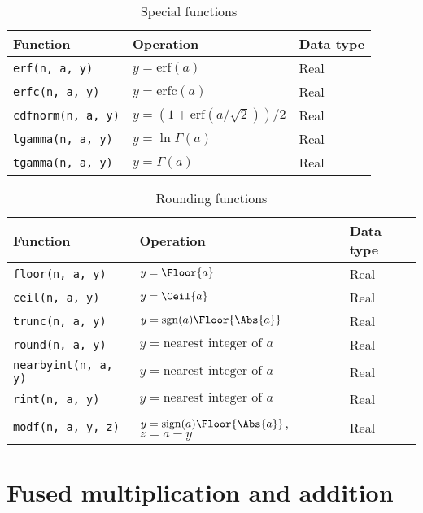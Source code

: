 \begin{table}
  \begin{tabularx}{\textwidth}{LLL}
    \toprule
    Function & Operation & Data type \\
    \midrule
    \texttt{erf(n, a, y)}     & $y = \mathrm{erf}(a)$  & Real \\
    \texttt{erfc(n, a, y)}    & $y = \mathrm{erfc}(a)$ & Real \\
    \texttt{cdfnorm(n, a, y)} & $y = (1 + \mathrm{erf}(a / \sqrt{2})) / 2$
    & Real \\
    \texttt{lgamma(n, a, y)}  & $y = \ln\Gamma(a)$     & Real \\
    \texttt{tgamma(n, a, y)}  & $y = \Gamma(a)$        & Real \\
    \bottomrule
  \end{tabularx}
  \caption{Special functions}
  \label{tab:Special functions}
\end{table}

\begin{table}
  \begin{tabularx}{\textwidth}{LLL}
    \toprule
    Function & Operation & Data type \\
    \midrule
    \texttt{floor(n, a, y)} & $y = \Floor{a}$                       & Real \\
    \texttt{ceil(n, a, y)}  & $y = \Ceil{a}$                        & Real \\
    \texttt{trunc(n, a, y)} & $y = \mathrm{sgn}(a)\Floor{\Abs{a}}$  & Real \\
    \texttt{round(n, a, y)} & $y = \text{nearest integer of }a$     & Real \\
    \texttt{nearbyint(n, a, y)} & $y = \text{nearest integer of }a$ & Real \\
    \texttt{rint(n, a, y)}  & $y = \text{nearest integer of }a$     & Real \\
    \texttt{modf(n, a, y, z)} &
    $y = \mathrm{sign}(a)\Floor{\Abs{a}}$, $z = a - y$ & Real \\
    \bottomrule
  \end{tabularx}
  \caption{Rounding functions}
  \label{tab:Rounding functions}
\end{table}

\clearpage

\section{Fused multiplication and addition}
\label{sec:Fused multiplication and addition}

